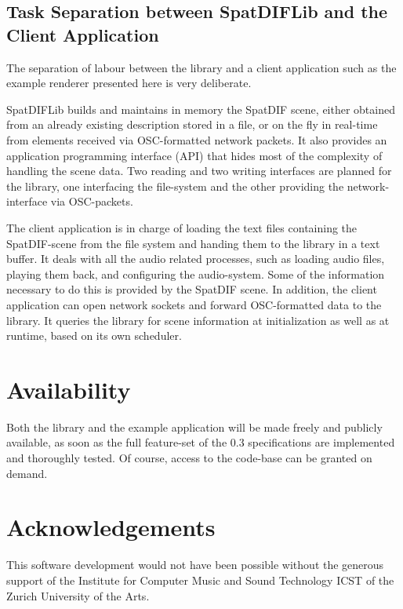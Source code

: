 \documentclass[a4paper]{article}
\begin{document}
\subsection{Task Separation between SpatDIFLib and the Client Application}

The separation of labour between the library and a client application such as the example renderer presented here is very deliberate.

SpatDIFLib builds and maintains in memory the SpatDIF scene, either obtained from an already existing description stored in a file, or on the fly in real-time from elements received via OSC-formatted network packets.
It also provides an application programming interface (API) that hides most of the complexity of handling the scene data.
Two reading and two writing interfaces are planned for the library, one interfacing the file-system and the other providing the network-interface via OSC-packets.

The client application is in charge of loading the text files containing the SpatDIF-scene from the file system and handing them to the library in a text buffer.
It deals with all the audio related processes, such as loading audio files, playing them back, and configuring the audio-system.
Some of the information necessary to do this is provided by the SpatDIF scene.
In addition, the client application can open network sockets and forward OSC-formatted data to the library.
It queries the library for scene information at initialization as well as at runtime, based on its own scheduler.

\section{Availability}%

Both the library and the example application will be made freely and publicly available, as soon as the full feature-set of the 0.3 specifications are implemented and thoroughly tested.
Of course, access to the code-base can be granted on demand.

\section{Acknowledgements}%

This software development would not have been possible without the generous support of the Institute for Computer Music and Sound Technology ICST of the Zurich University of the Arts.
\end{document}
